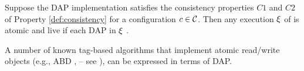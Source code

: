  \begin{theorem}\label{atomicity:A1}
 Suppose the DAP implementation satisfies the consistency properties $C1$ and $C2$ of  Property \ref{def:consistency}
 for a configuration $c\in\mathcal{C}$. 
 Then any execution $\EX$  of 
 is atomic and live if each DAP  in $\EX$ .
 \end{theorem}
 A number of known tag-based algorithms that implement atomic read/write objects 
	(e.g., ABD \cite{ABD96}, \fast \cite{CDGL04} -- see \cite{ARES:Arxiv:2018}), can be expressed 
	in terms of DAP.	

